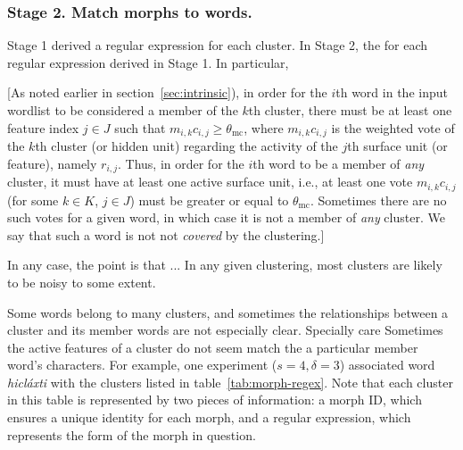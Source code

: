 
\subsubsection{Stage 2. Match morphs to words.}
 
Stage 1 derived a regular expression for each cluster. In Stage 2, the for each regular expression derived in Stage 1. 
In particular, 

[As noted earlier in section~\ref{sec:intrinsic}), in order for the $i$th word in the input wordlist to be considered a member of the $k$th cluster, there must be at least one feature 
index $j \in J$ such that $m_{i,k}c_{i,j} \geq \theta_{\textrm{mc}}$, 
where $m_{i,k}c_{i,j}$ is the weighted vote of the $k$th cluster (or hidden unit) 
regarding the activity of the $j$th surface unit (or feature), namely $r_{i,j}$. 
Thus, in order for the $i$th word to be a member of \emph{any} cluster, it 
must have at least one active surface unit, i.e., at least one vote  $m_{i,k}c_{i,j}$ 
(for some $k\in K$, $j \in J$) must be greater or equal to $\theta_{\text{mc}}$. 
Sometimes there are no such votes for a given word, in which case it is not a 
member of \emph{any} cluster. We say that such a word is not 
not \emph{covered} by the clustering.]

In any case, the point is that ... In any given clustering, most clusters are likely to be noisy to some 
extent. 

Some words belong to many clusters, and sometimes 
the relationships between a cluster and its member words are not especially
clear. Specially care 
Sometimes the active features of a cluster do not seem match the a particular member word's 
characters.
For example, one 
experiment ($s = 4,\delta = 3$) associated 
word \textit{hicl\'{a}xti} with the clusters listed in table~\ref{tab:morph-regex}. Note that each cluster in this table is represented by two pieces of information: a morph ID, which ensures a unique 
identity for each morph, and a regular expression, which represents the form of the morph in question. 

